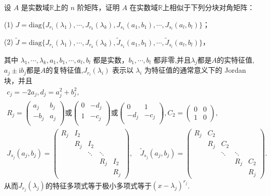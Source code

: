 \documentclass[../../main.tex]{subfiles}
\begin{document}
\begin{theorem}[实数域上的广义Jordan标准型]\label{theorem:实数域上的广义Jordan标准型}
设 $A$ 是实数域$\mathbb{R}$上的 $n$ 阶矩阵，证明 $A$ 在实数域$\mathbb{R}$上相似于下列分块对角矩阵：

(1) $J = \mathrm{diag}\{J_{r_1}(\lambda_1),\cdots,J_{r_k}(\lambda_k),J_{s_1}(a_1,b_1),\cdots,J_{s_l}(a_l,b_l)\}$；

(2) $\widetilde{J} = \mathrm{diag}\{J_{r_1}(\lambda_1),\cdots,J_{r_k}(\lambda_k),\widetilde{J}_{s_1}(a_1,b_1),\cdots,\widetilde{J}_{s_l}(a_l,b_l)\}$，

其中 $\lambda_1,\cdots,\lambda_k,a_1,b_1,\cdots,a_l,b_l$ 都是实数，$b_1,\cdots,b_l$ 都非零,并且$\lambda_j$都是$A$的实特征值,$a_j\pm \mathrm{i}b_j$都是$A$的复特征值,$J_{r_i}(\lambda_i)$ 表示以 $\lambda_i$ 为特征值的通常意义下的 Jordan 块，并且
\begin{gather*}
c_j=-2a_j,d_j=a_j^2+b_j^2,
\\
R_j = \left( \begin{matrix}
a_j&		b_j\\
-b_j&		a_j\\
\end{matrix} \right) \text{或}\left( \begin{matrix}
0&		-d_j\\
1&		-c_j\\
\end{matrix} \right) \text{或}\left( \begin{matrix}
0&		1\\
-d_j&		-c_j\\
\end{matrix} \right) 
,C_2 = \begin{pmatrix}0 & 0 \\ 1 & 0\end{pmatrix},
\\
J_{s_j}(a_j,b_j) = 
\begin{pmatrix}
R_j & I_2 & & \\
& R_j & I_2 & \\
& & \ddots & \ddots \\
& & & R_j & I_2 \\
& & & & R_j
\end{pmatrix}, \quad
\widetilde{J}_{s_j}(a_j,b_j) = 
\begin{pmatrix}
R_j & C_2 & & \\
& R_j & C_2 & \\
& & \ddots & \ddots \\
& & & R_j & C_2 \\
& & & & R_j
\end{pmatrix}.
\end{gather*}
从而$J_{r_j}(\lambda_j)$的特征多项式等于极小多项式等于$(x-\lambda_j)^{r_j}$.


\end{theorem}
\end{document}
